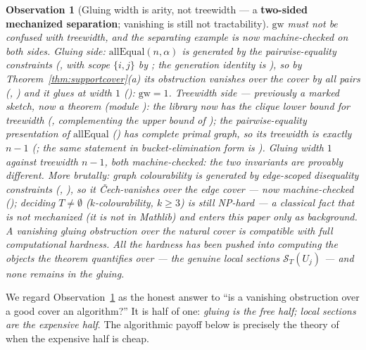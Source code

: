 \documentclass[11pt]{article}
\newtheorem{observation}{Observation}
\newcommand{\Sec}{\mathcal S}
\begin{document}
\begin{observation}[Gluing width is arity, not treewidth --- a
\textbf{two-sided mechanized separation}; vanishing is still not
tractability]
\label{obs:arity}
$\mathrm{gw}$ must not be confused with treewidth, and the
separating example is now machine-checked on \emph{both} sides.
Gluing side: $\mathrm{allEqual}(n, \alpha)$ is generated by the
pairwise-equality constraints (, with scope
$\{i,j\}$ by ; the generation
identity is ), so by
Theorem~\ref{thm:supportcover}(a) its obstruction vanishes over the
cover by all pairs (,
) and it glues at width
$1$ (): $\mathrm{gw} = 1$.
Treewidth side --- previously a marked sketch, now a theorem
(module ): the library now has the clique
\emph{lower} bound for treewidth (,
complementing the upper bound  of
); the pairwise-equality presentation of
$\mathrm{allEqual}$ () has complete primal
graph, so its treewidth is exactly $n - 1$
(; the same statement
in bucket-elimination form is
).  Gluing width $1$ against
treewidth $n-1$, both machine-checked: the two invariants are
provably different.  More brutally: graph colourability is
generated by edge-scoped disequality constraints
(, ), so it
\v{C}ech-vanishes over the edge cover --- now machine-checked
(); deciding $T \ne
\emptyset$ ($k$-colourability, $k \ge 3$) is still NP-hard --- a
classical fact that is \emph{not} mechanized (it is not in Mathlib)
and enters this paper only as background.  \emph{A vanishing gluing obstruction
over the natural cover is compatible with full computational
hardness.}  All the hardness has been pushed into computing the
objects the theorem quantifies over --- the genuine local sections
$\Sec_T(U_j)$ --- and none remains in the gluing.
\end{observation}

We regard Observation~\ref{obs:arity} as the honest answer to ``is a
vanishing obstruction over a good cover an algorithm?''  It is half
of one: \emph{gluing is the free half; local sections are the
expensive half}.  The algorithmic payoff below is precisely the
theory of when the expensive half is cheap.
\end{document}
